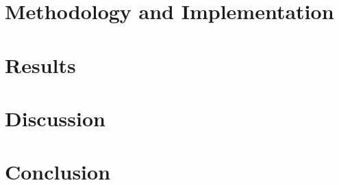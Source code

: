 \documentclass[conference]{IEEEtran}
\begin{document}
\section{Methodology and Implementation}

\section{Results}

\section{Discussion}

\section{Conclusion}

\section{}




\end{document}
